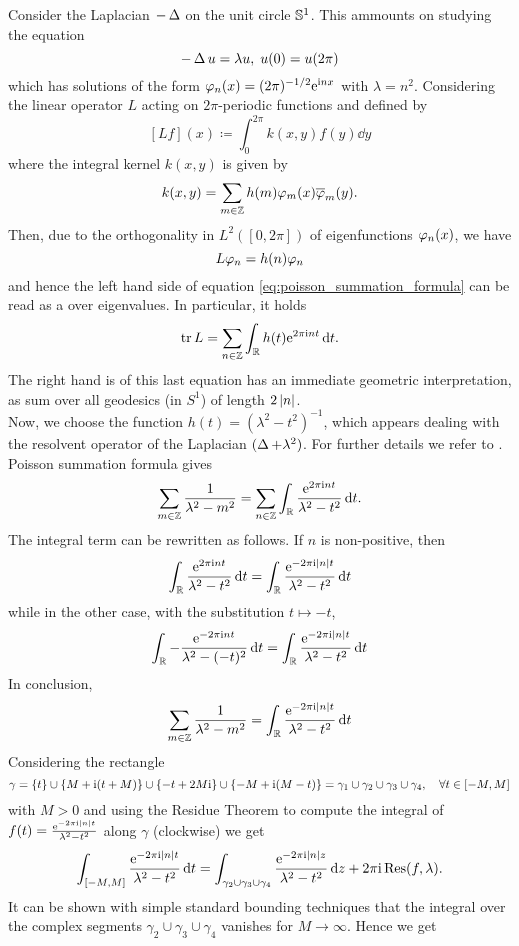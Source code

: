 Consider the Laplacian $-\Lapl$ on the unit circle $\S^{1}$. This ammounts on studying the equation
\[
-\Lapl u=\lambda u,\; u(0)=u(2\pi)
\]
which has solutions of the form $\vphi_{n}(x)=(2\pi)^{-1/2}\e^{\imi nx}$ with $\lambda=n^{2}$. Considering the linear operator $L$ acting on $2\pi$-periodic functions and defined by
\[
[Lf](x)\coloneqq \int_{0}^{2\pi}k(x,y)f(y)\dd y
\]
where the integral kernel $k(x,y)$ is given by
\[
k(x,y)=\sum_{m\in\Z}h(m)\vphi_{m}(x)\overline{\vphi}_{m}(y).
\]
Then, due to the orthogonality in $L^{2}([0,2\pi])$ of eigenfunctions $\vphi_{n}(x)$, we have 
\[
L\vphi_{n}=h(n)\vphi_{n}
\]
and hence the left hand side of equation \eqref{eq:poisson_summation_formula} can be read as a  over eigenvalues. In particular, it holds
\[
\tr L=\sum_{n\in\Z}\int_{\R}h(t)\e^{2\pi\imi nt}\dd t.
\]
The right hand is of this last equation has an immediate geometric interpretation, as sum over all geodesics (in $S^{1}$) of length $2\abs{n}$.\\
Now, we choose the function $h(t)=(\lambda^{2}-t^{2})^{-1}$, which appears dealing with the resolvent operator of the Laplacian $(\Lapl+\lambda^{2})$. For further details we refer to \cite{Markloff:article}. Poisson summation formula gives
\[
\sum_{m\in\Z}\frac{1}{\lambda^{2}-m^{2}}=\sum_{n\in\Z}\int_{\R}\frac{\e^{2\pi\imi nt}}{\lambda^{2}-t^{2}}\dd t.
\]
The integral term can be rewritten as follows. If $n$ is non-positive, then 
\[
\int_{\R}\frac{\e^{2\pi\imi nt}}{\lambda^{2}-t^{2}}\dd t=\int_{\R}\frac{\e^{-2\pi\imi\abs{n}t}}{\lambda^{2}-t^{2}}\dd t
\]
while in the other case, with the substitution $t\mapsto-t$,
\[
\int_{\R}-\frac{\e^{-2\pi\imi nt}}{\lambda^{2}-(-t)^{2}}\dd t=\int_{\R}\frac{\e^{-2\pi\imi\abs{n}t}}{\lambda^{2}-t^{2}}\dd t
\]
In conclusion, 
\[
\sum_{m\in\Z}\frac{1}{\lambda^{2}-m^{2}}=\int_{\R}\frac{\e^{-2\pi\imi\abs{n}t}}{\lambda^{2}-t^{2}}\dd t
\]
Considering the rectangle 
\[
\gamma = \{t\}\cup\{M+\imi(t+M)\}\cup\{-t+2M\imi\}\cup\{-M+\imi(M-t)\} = \gamma_{1}\cup\gamma_{2}\cup\gamma_{3}\cup\gamma_{4},\quad \forall t\in[-M,M]
\]
with $M>0$ and using the Residue Theorem to compute the integral of $f(t)=\frac{\e^{-2\pi\imi\abs{n}t}}{\lambda^{2}-t^{2}}$ along $\gamma$ (clockwise) we get
\[
\int_{[-M,M]}\frac{\e^{-2\pi\imi\abs{n}t}}{\lambda^{2}-t^{2}}\dd t=\int_{\gamma_{2}\cup\gamma_{3}\cup\gamma_{4}}\frac{\e^{-2\pi\imi\abs{n}z}}{\lambda^{2}-t^{2}}\dd z+2\pi\imi\Res(f,\lambda).
\]
It can be shown with simple standard bounding techniques that the integral over the complex segments $\gamma_{2}\cup\gamma_{3}\cup\gamma_{4}$ vanishes for $M\to\infty$. Hence we get 
